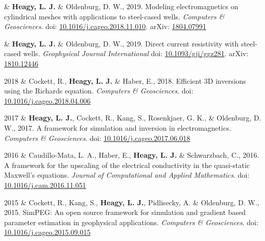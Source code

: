 \documentclass[a4paper, 11pt]{article}
\newcommand{\arxiv}[1]{arXiv: \href{https://arxiv.org/abs/#1}{#1}}
\newcommand{\doi}[1]{doi: \href{https://doi.org/#1}{#1}}
\newcommand{\subheading}[1]{
    \vspace{-0.1cm}
    {\large #1}\\
    \vspace{-0.3cm}
}
\begin{document}
\begin{entryrighttight}
& \textbf{Heagy, L. J.} \& Oldenburg, D. W., 2019. Modeling electromagnetics on cylindrical meshes with applications to steel-cased wells. \emph{Computers \& Geosciences}. \doi{10.1016/j.cageo.2018.11.010}. \arxiv{1804.07991}
\end{entryrighttight}

\begin{entryrighttight}
& \textbf{Heagy, L. J.} \& Oldenburg, D. W., 2019. Direct current resistivity with steel-cased wells. \emph{Geophysical Journal International} \doi{10.1093/gji/ggz281}. \arxiv{1810.12446}
\end{entryrighttight}

\begin{entryrighttight}
2018 & Cockett, R., \textbf{Heagy, L. J.} \& Haber, E., 2018. Efficient 3D inversions using the Richards equation. \emph{Computers \& Geosciences}. \doi{10.1016/j.cageo.2018.04.006}
\end{entryrighttight}

\begin{entryrighttight}
2017 & \textbf{Heagy, L. J.}, Cockett, R., Kang, S., Rosenkjaer, G. K., \& Oldenburg, D. W., 2017. A framework for simulation and inversion in electromagnetics. \emph{Computers \& Geosciences}. \doi{10.1016/j.cageo.2017.06.018}
\end{entryrighttight}

\begin{entryrighttight}
2016 & Caudillo-Mata, L. A., Haber, E., \textbf{Heagy, L. J.} \& Schwarzbach, C., 2016. A framework for the upscaling of the electrical conductivity in the quasi-static Maxwell's equations. \emph{Journal of Computational and Applied Mathematics}. \doi{10.1016/j.cam.2016.11.051}
\end{entryrighttight}

\begin{entryrighttight}
2015 & Cockett, R., Kang, S., \textbf{Heagy, L. J.}, Pidlisecky, A. \& Oldenburg, D. W., 2015. SimPEG: An open source framework for simulation and gradient based parameter estimation in geophysical applications. \emph{Computers \& Geosciences}. \doi{10.1016/j.cageo.2015.09.015}
\end{entryrighttight}



\end{document}
